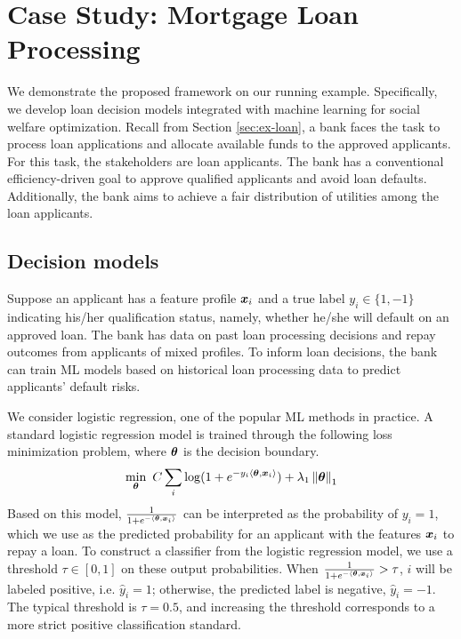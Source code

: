 \documentclass{article}[11pt]
\begin{document}
\section{Case Study: Mortgage Loan Processing}
We demonstrate the proposed framework on our running example. Specifically, we develop loan decision models integrated with machine learning for social welfare optimization. Recall from Section \ref{sec:ex-loan}, a bank faces the task to process loan applications and allocate available funds to the approved applicants. For this task, the stakeholders are loan applicants. The bank has a conventional efficiency-driven goal to approve qualified applicants and avoid loan defaults. Additionally, the bank aims to achieve a fair distribution of utilities among the loan applicants. 

\subsection{Decision models}
Suppose an applicant has a feature profile $\bm{x}_i$ and a true label $y_i \in \{1,-1\}$ indicating his/her qualification status, namely, whether he/she will default on an approved loan. The bank has data on past loan processing decisions and repay outcomes from applicants of mixed profiles. To inform loan decisions, the bank can train ML models based on historical loan processing data to predict applicants' default risks. 

We consider logistic regression, one of the popular ML methods in practice. A standard logistic regression model is trained through the following loss minimization problem, where $\bm{\theta}$ is the decision boundary.
\begin{gather} \label{sys:lr-uc}
    \begin{aligned}
    \min_{\bm{\theta}} ~ C\sum_i \log(1+e^{-y_i\langle \bm{\theta}, \bm{x}_i\rangle}) + \lambda_1 \left\lVert\bm{\theta}\right\rVert_1
    \end{aligned}
\end{gather}
\noindent
Based on this model, $\frac{1}{1+e^{-\langle \bm{\theta}, \bm{x}_i \rangle}}$ can be interpreted as the probability of $y_i = 1$, which we use as the predicted probability for an applicant with the features $\bm{x}_i$ to repay a loan. To construct a classifier from the logistic regression model, we use a threshold $\tau \in [0,1]$ on these output probabilities. When $\frac{1}{1+e^{-\langle \bm{\theta}, \bm{x}_i \rangle}} > \tau$, $i$ will be labeled positive, i.e. $\hat{y}_i = 1$; otherwise, the predicted label is negative, $\hat{y}_i = -1$. The typical threshold is $\tau = 0.5$, and increasing the threshold corresponds to a more strict positive classification standard. 
\end{document}
